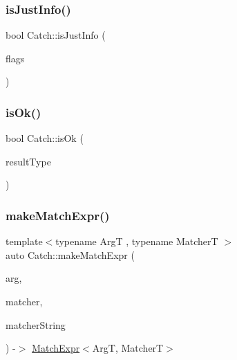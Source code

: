 \mbox{\label{namespace_catch_a54b01af61673a3e1f21f31713639b180}} 
\subsubsection{\texorpdfstring{is\+Just\+Info()}{isJustInfo()}}
{\footnotesize\ttfamily bool Catch\+::is\+Just\+Info (\begin{DoxyParamCaption}\item[{int}]{flags }\end{DoxyParamCaption})}

\mbox{\label{namespace_catch_a5205869c81c06d3460759cb86676ae68}} 
\subsubsection{\texorpdfstring{is\+Ok()}{isOk()}}
{\footnotesize\ttfamily bool Catch\+::is\+Ok (\begin{DoxyParamCaption}\item[{\mbox{\hyperlink{struct_catch_1_1_result_was_a624e1ee3661fcf6094ceef1f654601ef}{Result\+Was\+::\+Of\+Type}}}]{result\+Type }\end{DoxyParamCaption})}

\mbox{\label{namespace_catch_a23a9a9a6dfef7ecd5e0eaf553fc52de6}} 
\subsubsection{\texorpdfstring{make\+Match\+Expr()}{makeMatchExpr()}}
{\footnotesize\ttfamily template$<$typename ArgT , typename MatcherT $>$ \\
auto Catch\+::make\+Match\+Expr (\begin{DoxyParamCaption}\item[{ArgT const \&}]{arg,  }\item[{MatcherT const \&}]{matcher,  }\item[{\mbox{\hyperlink{class_catch_1_1_string_ref}{String\+Ref}} const \&}]{matcher\+String }\end{DoxyParamCaption}) -\/$>$ \mbox{\hyperlink{class_catch_1_1_match_expr}{Match\+Expr}}$<$ArgT, MatcherT$>$ }

